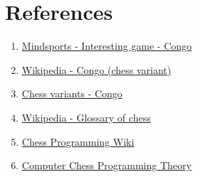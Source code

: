 \newpage

\section*{References}

\begin{enumerate}
\item \href{https://www.mindsports.nl/index.php/side-dishes/interesting-games?start=2}{Mindsports - Interesting game - Congo}
\item \href{https://en.wikipedia.org/wiki/Congo_(chess_variant)}{Wikipedia - Congo (chess variant)}
\item \href{https://www.chessvariants.com/ms.dir/congo.html}{Chess variants - Congo}
\item \href{https://en.wikipedia.org/wiki/Glossary_of_chess}{Wikipedia - Glossary of chess}
\item \href{https://www.chessprogramming.org/}{Chess Programming Wiki}
\item \href{http://www.frayn.net/beowulf/theory.html}{Computer Chess Programming Theory}
\end{enumerate}
